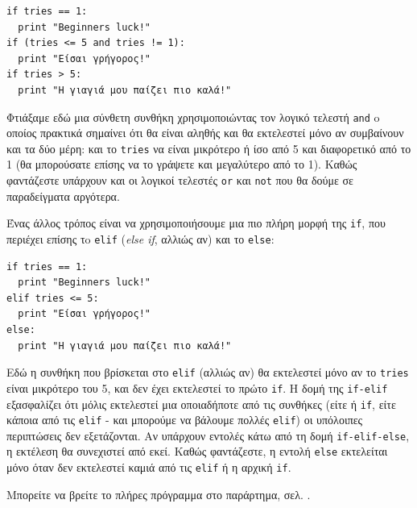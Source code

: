 \begin{verbatim}
if tries == 1:
  print "Beginners luck!"
if (tries <= 5 and tries != 1):
  print "Είσαι γρήγορος!"
if tries > 5:
  print "Η γιαγιά μου παίζει πιο καλά!"
\end{verbatim}

Φτιάξαμε εδώ μια σύνθετη συνθήκη χρησιμοποιώντας τον λογικό τελεστή {\tt and}
o οποίος πρακτικά σημαίνει ότι θα είναι αληθής και θα
εκτελεστεί μόνο αν συμβαίνουν και τα δύο μέρη: και το {\tt tries} να είναι
μικρότερο ή ίσο από 5 και διαφορετικό από το 1 (θα μπορούσατε επίσης να
το γράψετε και μεγαλύτερο από το 1). Καθώς φαντάζεστε υπάρχουν και οι
λογικοί τελεστές {\tt or} και {\tt not} που θα δούμε σε παραδείγματα αργότερα.

Ένας άλλος τρόπος είναι να χρησιμοποιήσουμε μια πιο πλήρη μορφή της {\tt if},
που περιέχει επίσης τo {\tt elif} ({\em else if}, αλλιώς αν) και το {\tt else}:

\begin{verbatim}
if tries == 1:
  print "Beginners luck!"
elif tries <= 5:
  print "Είσαι γρήγορος!"
else:
  print "Η γιαγιά μου παίζει πιο καλά!"
\end{verbatim}

Εδώ η συνθήκη που βρίσκεται στο {\tt elif} (αλλιώς αν) θα εκτελεστεί μόνο αν το {\tt tries} είναι μικρότερο του 5, και δεν έχει εκτελεστεί το πρώτο {\tt if}. H δομή της {\tt if-elif} εξασφαλίζει ότι μόλις εκτελεστεί μια οποιαδήποτε από τις συνθήκες (είτε ή {\tt if}, είτε κάποια από τις {\tt elif} - και μπορούμε να βάλουμε πολλές {\tt elif}) οι υπόλοιπες περιπτώσεις δεν εξετάζονται. Αν υπάρχουν εντολές κάτω από τη δομή {\tt if-elif-else}, η εκτέλεση θα συνεχιστεί από εκεί. Καθώς φαντάζεστε, η εντολή {\tt else} εκτελείται μόνο όταν δεν εκτελεστεί καμιά από τις {\tt elif} ή η αρχική {\tt if}.

Μπορείτε να βρείτε το πλήρες πρόγραμμα στο παράρτημα, σελ. \pageref{listing:guess}.

